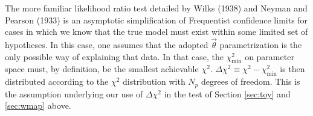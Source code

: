 \documentclass[useAMS,usenatbib]{aastex}
\begin{document}
\begin{appendix}
The more familiar likelihood ratio test detailed
by Wilks (1938)  and Neyman and Pearson (1933) is an asymptotic simplification
of Frequentist confidence limits
for cases in which we know that the true model must exist
within some limited set of hypotheses.  
In this case, one assumes that the adopted $\vec{\theta}$ parametrization
is the only possible way of explaining that data.  In that case, the
$\chi^2_\text{min}$ on parameter space must, by definition, be the smallest
achievable $\chi^2$.  $\Delta\chi^2\equiv\chi^2-\chi^2_\text{min}$
is then distributed according to the $\chi^2$ distribution with $N_p$ 
degrees of freedom.  This is the assumption underlying our use of
$\Delta\chi^2$ in the test of Section \ref{sec:toy} and \ref{sec:wmap} above.



\end{appendix}
\end{document}
